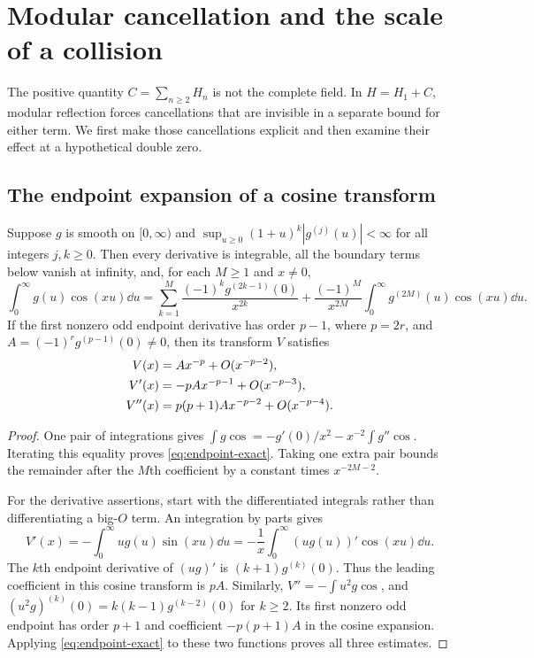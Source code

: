 \section{Modular cancellation and the scale of a collision}\label{sec:collisions}

The positive quantity $C=\sum_{n\ge2}H_n$ is not the complete field.
In $H=H_1+C$, modular reflection forces cancellations that are invisible
in a separate bound for either term. We first make those cancellations
explicit and then examine their effect at a hypothetical double zero.

\subsection{The endpoint expansion of a cosine transform}

\begin{lemma}\label{lem:endpoint}
Suppose $g$ is smooth on $[0,\infty)$ and
$\sup_{u\ge0}(1+u)^k|g^{(j)}(u)|<\infty$ for all integers $j,k\ge0$.
Then every derivative is integrable, all the boundary terms below vanish
at infinity, and,
for each $M\ge1$ and $x\ne0$,
\begin{equation}\label{eq:endpoint-exact}
 \int_0^\infty g(u)\cos(xu)\dd u
 =\sum_{k=1}^M\frac{(-1)^k g^{(2k-1)}(0)}{x^{2k}}
   +\frac{(-1)^M}{x^{2M}}
       \int_0^\infty g^{(2M)}(u)\cos(xu)\dd u.
\end{equation}
If the first nonzero odd endpoint derivative has order $p-1$, where
$p=2r$, and $A=(-1)^r g^{(p-1)}(0)\ne0$, then its transform $V$ satisfies
\begin{align}
 V(x)&=Ax^{-p}+O(x^{-p-2}),\notag\\
 V'(x)&=-pAx^{-p-1}+O(x^{-p-3}),\label{eq:endpoint-jets}\\
 V''(x)&=p(p+1)Ax^{-p-2}+O(x^{-p-4}).\notag
\end{align}
\end{lemma}
\begin{proof}
One pair of integrations gives
$\int g\cos=-g'(0)/x^2-x^{-2}\int g''\cos$.
Iterating this equality proves \eqref{eq:endpoint-exact}. Taking one extra
pair bounds the remainder after the $M$th coefficient by a constant times
$x^{-2M-2}$.

For the derivative assertions, start with the differentiated integrals
rather than differentiating a big-$O$ term. An integration by parts gives
\[
 V'(x)=-\int_0^\infty ug(u)\sin(xu)\dd u
       =-\frac1x\int_0^\infty (ug(u))'\cos(xu)\dd u.
\]
The $k$th endpoint derivative of $(ug)'$ is $(k+1)g^{(k)}(0)$.
Thus the leading coefficient in this cosine transform is $pA$.
Similarly, $V''=-\int u^2g\cos$, and
$(u^2g)^{(k)}(0)=k(k-1)g^{(k-2)}(0)$ for $k\ge2$.
Its first nonzero odd endpoint has order $p+1$ and coefficient
$-p(p+1)A$ in the cosine expansion. Applying \eqref{eq:endpoint-exact}
to these two functions proves all three estimates.
\end{proof}

